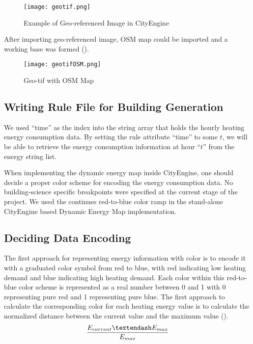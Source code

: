 \begin{figure}[h!]
  \centering
  \texttt{[image: geotif.png]}
  \caption[Geo-tif in CityEngine]{Example of Geo-referenced Image in
    CityEngine}
  \label{fig:geotif}
\end{figure}

After importing geo-referenced image, OSM map could be imported and a
working base was formed ().
\begin{figure}[h!]
  \centering
  \texttt{[image: geotifOSM.png]}
  \caption[Geo-tif with OSM Map]{Geo-tif with OSM Map}
  \label{fig:geotifOSM}
\end{figure}

\subsection{Writing Rule File for Building Generation}
We used ``time'' as the index into the string array that holds the
hourly heating energy consumption data. By setting the rule attribute
``time'' to some $t$, we will be able to retrieve the energy
consumption information at hour ``$t$'' from the energy string list.

When implementing the dynamic energy map inside CityEngine, one should
decide a proper color scheme for encoding the energy consumption
data. No building-science specific breakpoints were specified at the
current stage of the project. We used the continues red-to-blue color
ramp in the stand-alone CityEngine based Dynamic Energy Map
implementation.

\subsection{Deciding Data Encoding}
The first approach for representing energy information with color is
to encode it with a graduated color symbol from red to blue, with red
indicating low heating demand and blue indicating high heating
demand. Each color within this red-to-blue color scheme is represented
as a real number between 0 and 1 with 0 representing pure red and 1
representing pure blue. The first approach to calculate the
corresponding color for each heating energy value is to calculate the
normalized distance between the current value and the maximum value
().
\begin{equation}\label{eq:linear}
{E_{current} – E_{max} \over E_{max}}
\end{equation}

